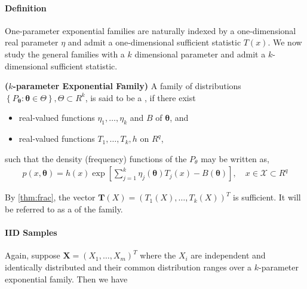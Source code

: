 \documentclass{article}
\newcommand{\bfs}[1]{\textbf{({#1}) }}
\begin{document}
\paragraph{Definition}
One-parameter exponential families are naturally indexed by a one-dimensional real parameter $\eta$ and admit a one-dimensional sufficient statistic $T(x)$. We now study the general families with a $k$ dimensional parameter and admit a $k$-dimensional sufficient statistic.
\begin{defa}\bfs{$k$-parameter Exponential Family}\label{def:kpara_exp}
A family of distributions $\left\{P_{\boldsymbol{\theta}}: \boldsymbol{\theta} \in \Theta\right\}, \Theta \subset R^{k}$, is said to be a , if there exist
\begin{itemize}
    \item real-valued functions $\eta_{1}, \ldots, \eta_{k}$ and $B$ of $\boldsymbol{\theta}$, and 
    \item real-valued functions $T_{1}, \ldots, T_{k}, h$ on $R^{q}$,
\end{itemize} such that the density (frequency) functions of the $P_{\theta}$ may be written as,
\begin{align*}
p(x, \boldsymbol{\theta})=h(x) \exp \left[\sum_{j=1}^{k} \eta_{j}(\boldsymbol{\theta}) T_{j}(x)-B(\boldsymbol{\theta})\right], \quad x \in \mathcal{X} \subset R^{q}
\end{align*}
\end{defa}
By \cref{thm:frac}, the vector $\mathbf{T}(X)=\left(T_{1}(X), \ldots, T_{k}(X)\right)^{T}$ is sufficient. It will be referred to as a  of the family.
\paragraph{IID Samples}\label{sec:mul_iid}
Again, suppose $\mathbf{X}=\left(X_{1}, \ldots, X_{m}\right)^{T}$ where the $X_{i}$ are independent and identically distributed and their common distribution ranges over a $k$-parameter exponential family. Then we have 
\end{document}
